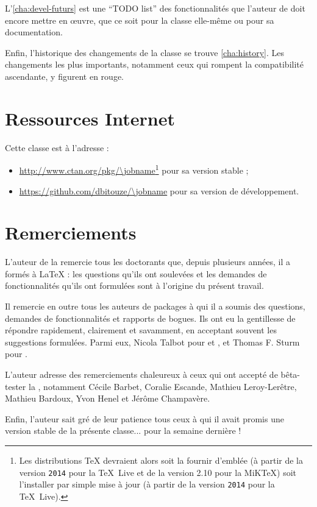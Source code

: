 L'\vref{cha:devel-futurs} est une \foreignquote{english}{TODO list} des
fonctionnalités que l'auteur de \yat{} doit encore mettre en œuvre, que ce soit
pour la classe elle-même ou pour sa documentation.

Enfin, l'historique des changements de la classe se trouve \vref{cha:history}.
Les changements les plus importants, notamment ceux qui rompent la compatibilité
ascendante, y figurent en rouge.

\section{Ressources Internet}
\label{sec:ressources-internet}

Cette classe est  à l'adresse :
\begin{itemize}
\item \url{http://www.ctan.org/pkg/\jobname}\footnote{Les distributions \TeX{}
    devraient alors soit la fournir d'emblée (à partir de la version
    \texttt{2014} pour la \TeX~Live et de la version 2.10 pour la MiK\TeX{})
    soit l'installer par simple mise à jour (à partir de la version
    \texttt{2014} pour la \TeX~Live).}  pour sa version stable ;
\item \url{https://github.com/dbitouze/\jobname} pour sa version de
  développement.
\end{itemize}

\section{Remerciements}
\label{sec:remerciements}

L'auteur de la \yatcl{} remercie tous les doctorants que, depuis plusieurs
années, il a formés à \LaTeX{} : les questions qu'ils ont soulevées et les
demandes de fonctionnalités qu'ils ont formulées sont à l'origine du présent
travail.

Il remercie en outre tous les auteurs de packages à qui il a soumis  des questions, demandes de fonctionnalités et rapports
de bogues. Ils ont eu la gentillesse de répondre rapidement, clairement et
savamment, en acceptant souvent les suggestions formulées. Parmi eux, Nicola
Talbot pour  et , et Thomas F. Sturm
pour .

L'auteur adresse des remerciements chaleureux à ceux qui ont accepté de
bêta-tester la \yatcl{}, notamment Cécile Barbet, Coralie Escande, Mathieu
Leroy-Lerêtre, Mathieu Bardoux, Yvon Henel et Jérôme Champavère.

Enfin, l'auteur sait gré de leur patience tous ceux à qui il avait promis une
version stable de la présente classe... pour la semaine dernière !

%
\iffalse
\fi
